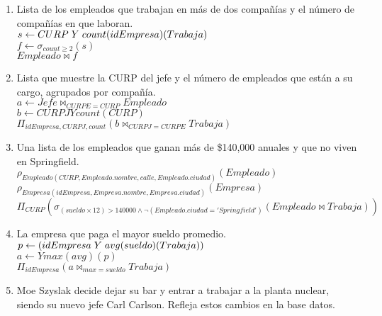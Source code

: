 \documentclass{article}
\begin{document}
\begin{enumerate}
\begin{enumerate}
				\item Lista de los empleados que trabajan en más de dos compañías y el número de compañías en
				que laboran.\\
				
				$s \leftarrow CURP \hspace{1mm} Y \hspace{1mm} count(idEmpresa)(Trabaja)$\\
				$f \leftarrow \sigma_{count \geq 2}(s)$\\
				$Empleado \bowtie f$\\
				
				\item Lista que muestre la CURP del jefe y el número de empleados que están a su cargo, agrupados
				por compañía.\\
				
				$a \leftarrow Jefe \bowtie_{CURPE=CURP} Empleado$\\
				$b \leftarrow CURPJYcount(CURP)$\\
				$\Pi_{idEmpresa, CURPJ, count}(b \bowtie_{CURPJ = CURPE} Trabaja)$\\
				
				\item Una lista de los empleados que ganan más de \$140,000 anuales y que no viven en Springfield.\\
				
				$\rho_{Empleado(CURP, Empleado.nombre, calle, Empleado.ciudad)}(Empleado)$\\
				$\rho_{Empresa(idEmpresa, Empresa.nombre, Empresa.ciudad)}(Empresa)$\\
				$\Pi_{CURP}(\sigma_{(sueldo \times 12) > 140 000 \land \lnot(Empleado.ciudad = 'Springfield')}(Empleado \bowtie Trabaja))$\\
				
				\item La empresa que paga el mayor sueldo promedio.\\
				
				$p \leftarrow (idEmpresa \hspace{1mm} Y \hspace{1mm} avg(sueldo)(Trabaja))$\\
				$a \leftarrow Ymax(avg)(p)$\\
				$\Pi_{idEmpresa}(a \bowtie_{max = sueldo} Trabaja)$\\
				
				\item Moe Szyslak decide dejar su bar y entrar a trabajar a la planta nuclear, siendo su nuevo jefe
				Carl Carlson. Refleja estos cambios en la base datos.\\
				

\end{enumerate}
\end{enumerate}
\end{document}
